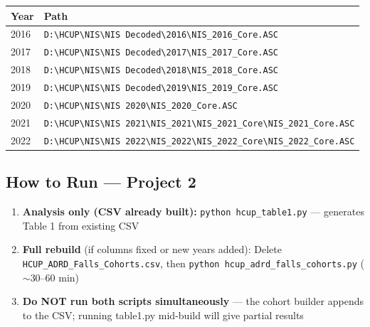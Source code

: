 \documentclass[11pt,letterpaper]{article}
\begin{document}
\begin{center}
\begin{tabular}{ll}
\toprule
\textbf{Year} & \textbf{Path} \\
\midrule
2016 & \texttt{D:\textbackslash HCUP\textbackslash NIS\textbackslash NIS Decoded\textbackslash 2016\textbackslash NIS\_2016\_Core.ASC} \\
2017 & \texttt{D:\textbackslash HCUP\textbackslash NIS\textbackslash NIS Decoded\textbackslash 2017\textbackslash NIS\_2017\_Core.ASC} \\
2018 & \texttt{D:\textbackslash HCUP\textbackslash NIS\textbackslash NIS Decoded\textbackslash 2018\textbackslash NIS\_2018\_Core.ASC} \\
2019 & \texttt{D:\textbackslash HCUP\textbackslash NIS\textbackslash NIS Decoded\textbackslash 2019\textbackslash NIS\_2019\_Core.ASC} \\
2020 & \texttt{D:\textbackslash HCUP\textbackslash NIS\textbackslash NIS 2020\textbackslash NIS\_2020\_Core.ASC} \\
2021 & \texttt{D:\textbackslash HCUP\textbackslash NIS\textbackslash NIS 2021\textbackslash NIS\_2021\textbackslash NIS\_2021\_Core\textbackslash NIS\_2021\_Core.ASC} \\
2022 & \texttt{D:\textbackslash HCUP\textbackslash NIS\textbackslash NIS 2022\textbackslash NIS\_2022\textbackslash NIS\_2022\_Core\textbackslash NIS\_2022\_Core.ASC} \\
\bottomrule
\end{tabular}
\end{center}

\subsection{How to Run — Project 2}

\begin{enumerate}
  \item \textbf{Analysis only (CSV already built):}
        \texttt{python hcup\_table1.py} — generates Table 1 from existing CSV
  \item \textbf{Full rebuild} (if columns fixed or new years added):
        Delete \texttt{HCUP\_ADRD\_Falls\_Cohorts.csv}, then
        \texttt{python hcup\_adrd\_falls\_cohorts.py} ($\sim$30–60 min)
  \item \textbf{Do NOT run both scripts simultaneously} — the cohort builder
        appends to the CSV; running table1.py mid-build will give partial results
\end{enumerate}
\end{document}
